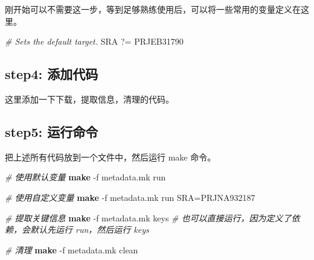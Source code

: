 \documentclass[]{ctexbook}
\newenvironment{Shaded}{\begin{snugshade}}{\end{snugshade}}
\newcommand{\AttributeTok}[1]{\textcolor[rgb]{0.13,0.29,0.53}{#1}}
\newcommand{\CharTok}[1]{\textcolor[rgb]{0.31,0.60,0.02}{#1}}
\newcommand{\CommentTok}[1]{\textcolor[rgb]{0.56,0.35,0.01}{\textit{#1}}}
\newcommand{\DataTypeTok}[1]{\textcolor[rgb]{0.13,0.29,0.53}{#1}}
\newcommand{\DecValTok}[1]{\textcolor[rgb]{0.00,0.00,0.81}{#1}}
\newcommand{\FunctionTok}[1]{\textcolor[rgb]{0.13,0.29,0.53}{\textbf{#1}}}
\newcommand{\NormalTok}[1]{#1}
\newcommand{\StringTok}[1]{\textcolor[rgb]{0.31,0.60,0.02}{#1}}
\begin{document}
刚开始可以不需要这一步，等到足够熟练使用后，可以将一些常用的变量定义在这里。

\begin{Shaded}
\begin{Highlighting}[]
\CommentTok{\# Sets the default target.}
\DataTypeTok{SRA} \CharTok{?=}\StringTok{ PRJEB31790}
\end{Highlighting}
\end{Shaded}

\subsection{step4: 添加代码}\label{step4-ux6dfbux52a0ux4ee3ux7801}

这里添加一下下载，提取信息，清理的代码。

\begin{Shaded}
\end{Shaded}

\subsection{step5: 运行命令}\label{step5-ux8fd0ux884cux547dux4ee4}

把上述所有代码放到一个文件中，然后运行 make 命令。

\begin{Shaded}
\begin{Highlighting}[]
\CommentTok{\# 使用默认变量}
\FunctionTok{make} \AttributeTok{{-}f}\NormalTok{ metadata.mk run}

\CommentTok{\# 使用自定义变量}
\FunctionTok{make} \AttributeTok{{-}f}\NormalTok{ metadata.mk run SRA=PRJNA932187}

\CommentTok{\# 提取关键信息}
\FunctionTok{make} \AttributeTok{{-}f}\NormalTok{ metadata.mk keys}
\CommentTok{\# 也可以直接运行，因为定义了依赖，会默认先运行 run，然后运行 keys}

\CommentTok{\# 清理}
\FunctionTok{make} \AttributeTok{{-}f}\NormalTok{ metadata.mk clean}
\end{Highlighting}
\end{Shaded}
\end{document}
